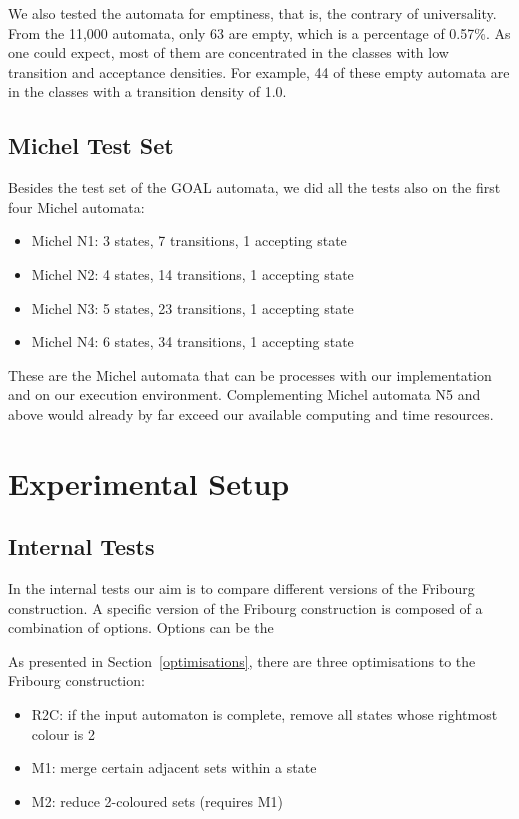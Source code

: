 We also tested the automata for emptiness, that is, the contrary of universality. From the 11,000 automata, only 63 are empty, which is a percentage of 0.57\%. As one could expect, most of them are concentrated in the classes with low transition and acceptance densities. For example, 44 of these empty automata are in the classes with a transition density of 1.0.


\subsection{Michel Test Set}
Besides the test set of the GOAL automata, we did all the tests also on the first four Michel automata:
\begin{itemize}
\item Michel N1: 3 states, 7 transitions, 1 accepting state
\item Michel N2: 4 states, 14 transitions, 1 accepting state
\item Michel N3: 5 states, 23 transitions, 1 accepting state
\item Michel N4: 6 states, 34 transitions, 1 accepting state
\end{itemize}

These are the Michel automata that can be processes with our implementation and on our execution environment. Complementing Michel automata N5 and above would already by far exceed our available computing and time resources.


\section{Experimental Setup}

\subsection{Internal Tests}
\label{4_internal}
In the internal tests our aim is to compare different versions of the Fribourg construction. A specific version of the Fribourg construction is composed of a combination of options. Options can be the 

As presented in Section~\ref{optimisations}, there are three optimisations to the Fribourg construction:
\begin{itemize}
\item R2C: if the input automaton is complete, remove all states whose rightmost colour is 2
\item M1: merge certain adjacent sets within a state
\item M2: reduce 2-coloured sets (requires M1)
\end{itemize}

